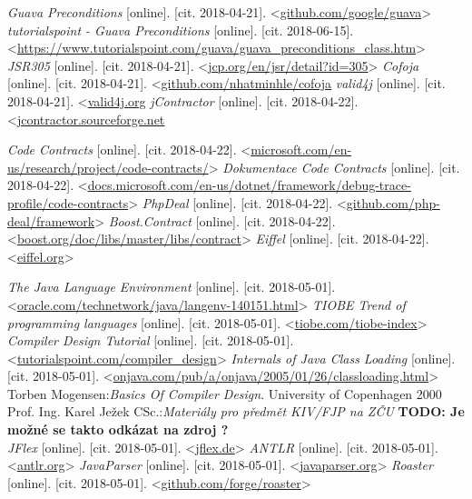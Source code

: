 \begin{thebibliography}{99}
 {\it Guava Preconditions} [online]. [cit. 2018-04-21]. \textless\url{github.com/google/guava}\textgreater
{} {\it tutorialspoint - Guava Preconditions} [online]. [cit. 2018-06-15]. \textless\url{https://www.tutorialspoint.com/guava/guava_preconditions_class.htm}\textgreater
{} {\it JSR305} [online]. [cit. 2018-04-21]. \textless\url{jcp.org/en/jsr/detail?id=305}\textgreater
{} {\it Cofoja} [online]. [cit. 2018-04-21]. \textless\url{github.com/nhatminhle/cofoja}
 {\it valid4j} [online]. [cit. 2018-04-21]. \textless\url{valid4j.org}	
 {\it jContractor} [online]. [cit. 2018-04-22]. \textless\url{jcontractor.sourceforge.net}

 {\it Code Contracts} [online]. [cit. 2018-04-22]. \textless\url{microsoft.com/en-us/research/project/code-contracts/}\textgreater
{} {\it Dokumentace Code Contracts} [online]. [cit. 2018-04-22]. \textless\url{docs.microsoft.com/en-us/dotnet/framework/debug-trace-profile/code-contracts}\textgreater
{} {\it PhpDeal} [online]. [cit. 2018-04-22]. \textless\url{github.com/php-deal/framework}\textgreater
{} {\it Boost.Contract} [online]. [cit. 2018-04-22]. \textless\url{boost.org/doc/libs/master/libs/contract}\textgreater
{} {\it Eiffel} [online]. [cit. 2018-04-22]. \textless\url{eiffel.org}\textgreater

 {\it The Java Language Environment} [online]. [cit. 2018-05-01]. \textless\url{oracle.com/technetwork/java/langenv-140151.html}\textgreater
{} {\it TIOBE Trend of programming languages} [online]. [cit. 2018-05-01]. \textless\url{tiobe.com/tiobe-index}\textgreater
{} {\it Compiler Design Tutorial} [online]. [cit. 2018-05-01]. \textless\url{tutorialspoint.com/compiler_design}\textgreater
{} {\it Internals of Java Class Loading} [online]. [cit. 2018-05-01]. \textless\url{onjava.com/pub/a/onjava/2005/01/26/classloading.html}\textgreater
{} Torben Mogensen:\emph{Basics Of Compiler Design}. University of Copenhagen 2000
 Prof. Ing. Karel Ježek CSc.:\emph{Materiály pro předmět KIV/FJP na ZČU}
\textbf{\textcolor{pblue}{TODO: Je možné se takto odkázat na zdroj ?}}\\


 {\it JFlex} [online]. [cit. 2018-05-01]. \textless\url{jflex.de}\textgreater
{} {\it ANTLR} [online]. [cit. 2018-05-01]. \textless\url{antlr.org}\textgreater
{} {\it JavaParser} [online]. [cit. 2018-05-01]. \textless\url{javaparser.org}\textgreater
{} {\it Roaster} [online]. [cit. 2018-05-01]. \textless\url{github.com/forge/roaster}\textgreater





\end{thebibliography}

